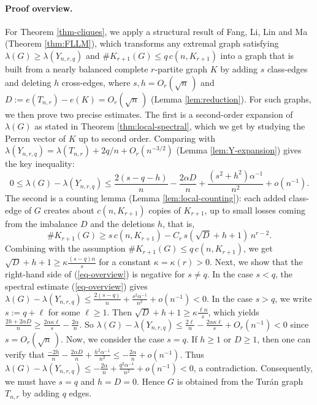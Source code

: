 \documentclass[11pt,a4paper]{article}
\theoremstyle{definition}
\theoremstyle{plain}
\renewcommand{\le}{\leqslant}
\renewcommand{\ge}{\geqslant}
\begin{document}
\paragraph{Proof overview.}
For Theorem \ref{thm-cliques}, we apply a structural result of Fang, Li, Lin and Ma (Theorem \ref{thm:FLLM}), which transforms any extremal graph satisfying $\lambda (G)\ge \lambda (Y_{n,r,q})$ and 
$\texttt{\#}K_{r+1}(G) \le q\, c( n,K_{r+1})$ into a graph that is built from a nearly balanced complete $r$-partite graph $K$ by adding $s$ class-edges and deleting $h$ cross-edges, where $s, h= O_r(\sqrt n\,)$ and $D:=e(T_{n,r})-e(K)=O_r(\sqrt n\,)$ (Lemma \ref{lem:reduction}). For such graphs, we then prove two precise estimates. 
The first is a
second-order expansion of $\lambda (G)$ as stated in Theorem \ref{thm:local-spectral}, 
which we get by studying the Perron vector of $K$ up to second order. Comparing with $\lambda(Y_{n,r,q})=\lambda(T_{n,r})+2q/n+O_r(n^{-3/2})$ (Lemma \ref{lem:Y-expansion}) gives the key inequality:  
\begin{equation} \label{eq-overview}
        0\le \lambda(G)-\lambda(Y_{n,r,q})
        \le \frac{2(s-q-h)}{n}-\frac{2\alpha D}{n}
            +\frac{(s^2+h^2)\alpha^{-1}}{n^2}+o(n^{-1}).  
\end{equation}  
The second is a counting
lemma (Lemma \ref{lem:local-counting}): each added class-edge of $G$ creates about $c(n,K_{r+1})$ copies of
$K_{r+1}$, up to small losses coming from the imbalance $D$ and the deletions $h$, that is,  
\[         \texttt{\#} K_{r+1}(G)\ge s\,c(n,K_{r+1})-C_r\,s \left(\sqrt D+h+1 \right)\,n^{r-2}.  \]
Combining with the assumption $\texttt{\#}K_{r+1}(G) \le q\, c( n,K_{r+1})$, we get $\sqrt{D}+ h +1 \ge \kappa \frac{(s-q) n}{s}$ for a constant $\kappa=\kappa(r) >0$.  
Next, we show that the right-hand side of (\ref{eq-overview}) is negative for $s\neq q$. 
In the case $s<q$, 
the spectral estimate (\ref{eq-overview}) gives $\lambda (G)- \lambda (Y_{n,r,q}) \le \frac{2(s-q)}{n} + \frac{s^2\alpha^{-1}}{n^2}+ o(n^{-1}) <0$. 
In the case $s> q$, we write $s:=q+\ell$ for some $\ell \ge 1$.  Then $\sqrt{D} + h +1 \ge \kappa \frac{\ell n}{s}$, which yields $\frac{2h + 2\alpha D}{n} \ge \frac{2\alpha \kappa \ell}{s} - \frac{2\alpha }{n}$. 
So $\lambda (G)- \lambda (Y_{n,r,q}) \le \frac{2\ell}{n} - \frac{2\alpha \kappa \ell }{s} + O_r(n^{-1}) <0$ since  $s=O_r(\sqrt{n}\,)$.  
Now, we consider the case $s=q$. 
If $h\ge 1$ or $D\ge 1$, then one can verify that $\frac{-2h}{n} - \frac{2\alpha D}{n} + \frac{h^2 \alpha^{-1}}{n^2} \le 
 - \frac{2\alpha}{n} + o(n^{-1})$. 
 Thus $\lambda (G) - \lambda (Y_{n,r,q}) \le - \frac{2\alpha}{n} + \frac{q^2 \alpha^{-1}}{n^2} + o(n^{-1}) <0$, a contradiction. 
 Consequently, we must have $s=q$ and $h=D=0$. 
 Hence $G$ is obtained from the Tur\'{a}n graph $T_{n,r}$ by adding $q$ edges. 
\end{document}
